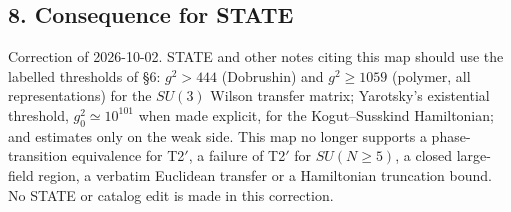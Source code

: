 \documentclass[11pt,a4paper]{article}
\begin{document}
\hypertarget{consequence-for-state}{%
\subsection{8. Consequence for STATE}\label{consequence-for-state}}

Correction of 2026-10-02. STATE and other notes citing this map should
use the labelled thresholds of §6: \(g^2>444\) (Dobrushin) and
\(g^2\ge1059\) (polymer, all representations) for the \(SU(3)\) Wilson
transfer matrix; Yarotsky's existential threshold,
\(g_0^2\simeq10^{101}\) when made explicit, for the Kogut--Susskind
Hamiltonian; and estimates only on the weak side. This map no longer
supports a phase-transition equivalence for T2\('\), a failure of
T2\('\) for \(SU(N\ge5)\), a closed large-field region, a verbatim
Euclidean transfer or a Hamiltonian truncation bound. No STATE or
catalog edit is made in this correction.
\end{document}
